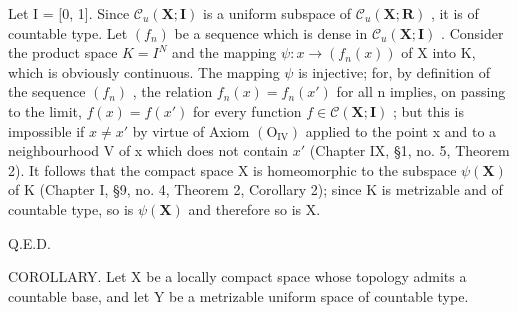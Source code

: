 \begin{enumerate}
  Let I = {[}0, 1{]}. Since \(\mathcal{C}_{u}(\mathbf{X};\mathbf{I})\) is a uniform subspace of \(\mathcal{C}_{u}(\mathbf{X};\mathbf{R})\) , it is of countable type. Let \((f_{n})\) be a sequence which is dense in \(\mathcal{C}_{u}(\mathbf{X};\mathbf{I})\) . Consider the product space \(K=I^{N}\) and the mapping \(\psi: x\to(f_{n}(x))\) of X into K, which is obviously continuous. The mapping \(\psi\) is injective; for, by definition of the sequence \((f_{n})\) , the relation \(f_{n}(x)=f_{n}(x')\) for all n implies, on passing to the limit, \(f(x)=f(x')\) for every function \(f\in\mathcal{C}(\mathbf{X};\mathbf{I})\) ; but this is impossible if \(x\neq x'\) by virtue of Axiom \((\mathrm{O}_{\mathrm{IV}})\) applied to the point x and to a neighbourhood V of x which does not contain \(x'\) (Chapter IX, §1, no. 5, Theorem 2). It follows that the compact space X is homeomorphic to the subspace \(\psi(\mathbf{X})\) of K (Chapter I, §9, no. 4, Theorem 2, Corollary 2); since K is metrizable and of countable type, so is \(\psi(\mathbf{X})\) and therefore so is X.
\end{enumerate}

Q.E.D.

COROLLARY. Let X be a locally compact space whose topology admits a countable base, and let Y be a metrizable uniform space of countable type.

